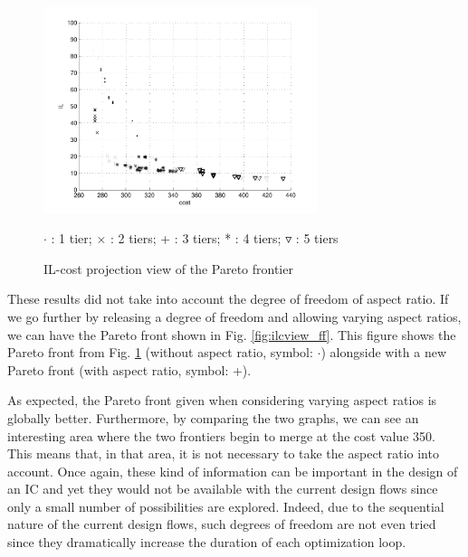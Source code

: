 \begin{figure}[h!]
\begin{center}
\includegraphics[width=8cm]{ultiplot1.pdf}
\end{center}
\vspace{-0.5cm}
\caption{IL-cost projection view of the Pareto frontier}
\begin{center}
\begin{scriptsize}
$\cdot$ : 1 tier; $\times$ : 2 tiers; + : 3 tiers; * : 4 tiers; $\triangledown$ : 5 tiers\\
\end{scriptsize}
\end{center}
\label{fig:ilcview}
\end{figure}

These results did not take into account the degree of freedom of aspect ratio. If we go further by releasing a degree of freedom and allowing varying aspect ratios, we can have the Pareto front shown in Fig. \ref{fig:ilcview_ff}. This figure shows the Pareto front from Fig. \ref{fig:ilcview} (without aspect ratio, symbol: $\cdot$) alongside with a new Pareto front (with aspect ratio, symbol: +).

As expected, the Pareto front given when considering varying aspect ratios is globally better. Furthermore, by comparing the two graphs, we can see an interesting area where the two frontiers begin to merge at the cost value 350. This means that, in that area, it is not necessary to take the aspect ratio into account. Once again, these kind of information can be important in the design of an IC and yet they would not be available with the current design flows since only a small number of possibilities are explored. Indeed, due to the sequential nature of the current design flows, such degrees of freedom are not even tried since they dramatically increase the duration of each optimization loop.

